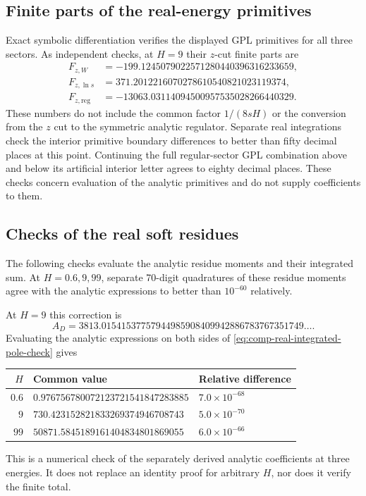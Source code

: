 \subsection{Finite parts of the real-energy primitives}
Exact symbolic differentiation verifies the displayed GPL
primitives for all three sectors. As independent checks, at $H=9$
their $z$-cut finite parts are
\begin{align}
 F_{z,W}&=-199.1245079022571280440396316233659,\\
 F_{z,\ln s}&=371.2012216070278610540821023119374,\\
 F_{z,\mathrm{reg}}&=-13063.03114094500957535028266440329.
\end{align}
These numbers do not include the common factor $1/(8sH)$ or the
conversion from the $z$ cut to the symmetric analytic regulator.
Separate real integrations check the interior primitive boundary
differences to better than fifty decimal places at this point.
Continuing the full regular-sector GPL combination above and below
its artificial interior letter agrees to eighty decimal places.
These checks concern evaluation of the analytic primitives and do
not supply coefficients to them.

\subsection{Checks of the real soft residues}
The following checks evaluate the analytic residue moments and their
integrated sum. At $H=0.6,9,99$, separate 70-digit quadratures of these residue
moments agree with the analytic expressions to better than
$10^{-60}$ relatively.

At $H=9$ this correction is
\begin{equation}
 A_D=3813.01541537757944985908409942886783767351749\ldots.
\end{equation}
Evaluating the analytic expressions on both sides of
\eqref{eq:comp-real-integrated-pole-check} gives
\begin{center}
\begin{tabular}{rll}
\toprule
$H$ & Common value & Relative difference\\
\midrule
$0.6$ & $0.976756780072123721541847283885$ & $7.0\times10^{-68}$\\
$9$ & $730.423152821833269374946708743$ & $5.0\times10^{-70}$\\
$99$ & $50871.5845189161404834801869055$ & $6.0\times10^{-66}$\\
\bottomrule
\end{tabular}
\end{center}
This is a numerical check of the separately derived analytic
coefficients at three energies. It does not replace an identity
proof for arbitrary $H$, nor does it verify the finite total.


